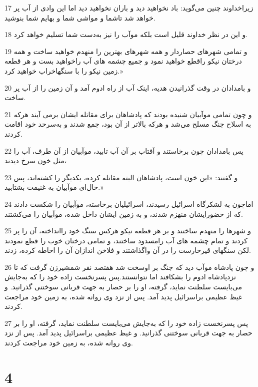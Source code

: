 \par 17 زیراخداوند چنین می‌گوید: باد نخواهید دید و باران نخواهید دید اما این وادی از آب پر خواهد شد تاشما و مواشی شما و بهایم شما بنوشید.
\par 18 و این در نظر خداوند قلیل است بلکه موآب را نیز به‌دست شما تسلیم خواهد کرد.
\par 19 و تمامی شهرهای حصاردار و همه شهرهای بهترین را منهدم خواهید ساخت و همه درختان نیکو راقطع خواهید نمود و جمیع چشمه های آب راخواهید بست و هر قطعه زمین نیکو را با سنگهاخراب خواهید کرد.»
\par 20 و بامدادان در وقت گذرانیدن هدیه، اینک آب از راه ادوم آمد و آن زمین را از آب پر ساخت.
\par 21 و چون تمامی موآبیان شنیده بودند که پادشاهان برای مقاتله ایشان برمی آیند هر‌که به اسلاح جنگ مسلح می‌شد و هرکه بالاتر از آن بود، جمع شدند و به‌سرحد خود اقامت کردند.
\par 22 پس بامدادان چون برخاستند و آفتاب بر آن آب تابید، موآبیان از آن طرف، آب را مثل خون سرخ دیدند،
\par 23 و گفتند: «این خون است، پادشاهان البته مقاتله کرده، یکدیگر را کشته‌اند، پس حال‌ای موآبیان به غنیمت بشتابید.»
\par 24 اماچون به لشکرگاه اسرائیل رسیدند، اسرائیلیان برخاسته، موآبیان را شکست دادند که از حضورایشان منهزم شدند، و به زمین ایشان داخل شده، موآبیان را می‌کشتند.
\par 25 و شهرها را منهدم ساختند و بر هر قطعه نیکو هرکس سنگ خود راانداخته، آن را پر کردند و تمام چشمه های آب رامسدود ساختند، و تمامی درختان خوب را قطع نمودند لکن سنگهای قیرحارست را در آن واگذاشتند و فلاخن اندازان آن را احاطه کرده، زدند.
\par 26 و چون پادشاه موآب دید که جنگ بر اوسخت شد هفتصد نفر شمشیرزن گرفت که تا نزدپادشاه ادوم را بشکافند اما نتوانستند.پس پسرنخست زاده خود را که به‌جایش می‌بایست سلطنت نماید، گرفته، او را بر حصار به جهت قربانی سوختنی گذرانید. و غیظ عظیمی براسرائیل پدید آمد. پس از نزد وی روانه شده، به زمین خود مراجعت کردند.
\par 27 پس پسرنخست زاده خود را که به‌جایش می‌بایست سلطنت نماید، گرفته، او را بر حصار به جهت قربانی سوختنی گذرانید. و غیظ عظیمی براسرائیل پدید آمد. پس از نزد وی روانه شده، به زمین خود مراجعت کردند. 
 
\chapter{4}

